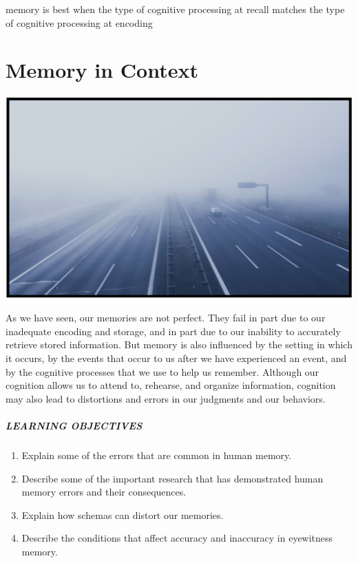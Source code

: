 \documentclass[
]{krantz}
\providecommand{\tightlist}{%
  \setlength{\itemsep}{0pt}\setlength{\parskip}{0pt}}
\begin{document}
memory is best when the type of cognitive processing at recall matches the type of cognitive processing at encoding

\chapter{Memory in Context}\label{memory-in-context}

\begin{center}\includegraphics[width=1\linewidth]{images/ch6/fig0} \end{center}

As we have seen, our memories are not perfect. They fail in part due to our inadequate encoding and storage, and in part due to our inability to accurately retrieve stored information. But memory is also influenced by the setting in which it occurs, by the events that occur to us after we have experienced an event, and by the cognitive processes that we use to help us remember. Although our cognition allows us to attend to, rehearse, and organize information, cognition may also lead to distortions and errors in our judgments and our behaviors.

\paragraph*{LEARNING OBJECTIVES}\label{learning-objectives-5}

\begin{enumerate}
\def\labelenumi{\arabic{enumi}.}
\tightlist
\item
  Explain some of the errors that are common in human memory.
\item
  Describe some of the important research that has demonstrated human memory errors and their consequences.
\item
  Explain how schemas can distort our memories.
\item
  Describe the conditions that affect accuracy and inaccuracy in eyewitness memory.
\end{enumerate}
\end{document}
